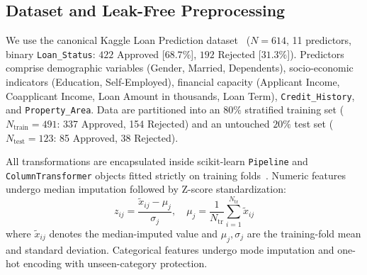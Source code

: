 \documentclass{COMPXXXX}
\begin{document}
\subsection{Dataset and Leak-Free Preprocessing}
We use the canonical Kaggle Loan Prediction dataset~\cite{kaggleloan} ($N=614$, 11 predictors, binary \texttt{Loan\_Status}: $422$ Approved [$68.7\%$], $192$ Rejected [$31.3\%$]). Predictors comprise demographic variables (Gender, Married, Dependents), socio-economic indicators (Education, Self-Employed), financial capacity (Applicant Income, Coapplicant Income, Loan Amount in thousands, Loan Term), \texttt{Credit\_History}, and \texttt{Property\_Area}. Data are partitioned into an $80\%$ stratified training set ($N_{\text{train}}=491$: 337 Approved, 154 Rejected) and an untouched $20\%$ test set ($N_{\text{test}}=123$: 85 Approved, 38 Rejected).

All transformations are encapsulated inside scikit-learn \texttt{Pipeline} and \texttt{ColumnTransformer} objects fitted strictly on training folds~\cite{pedregosa2011}. Numeric features undergo median imputation followed by Z-score standardization:
\begin{equation}
z_{ij} = \frac{\tilde{x}_{ij} - \mu_j}{\sigma_j}, \quad \mu_j = \frac{1}{N_{\text{tr}}}\sum_{i=1}^{N_{\text{tr}}} \tilde{x}_{ij}
\end{equation}
where $\tilde{x}_{ij}$ denotes the median-imputed value and $\mu_j, \sigma_j$ are the training-fold mean and standard deviation. Categorical features undergo mode imputation and one-hot encoding with unseen-category protection.
\end{document}
